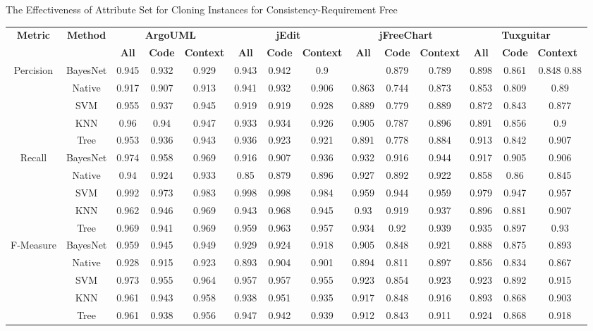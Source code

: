 \begin{table*}[htbp]
\scriptsize
{The Effectiveness of Attribute Set for Cloning Instances for Consistency-Requirement Free}
\vspace{0.5em}
\centering
\begin{tabular}{cccccccccccccc}
\toprule[1.5pt]
\multirow{2}{*}{\textbf{Metric}}&\multirow{2}{*}{\textbf{Method}}&\multicolumn{3}{c}{\textbf{ArgoUML}}&\multicolumn{3}{c}{\textbf{jEdit}}&\multicolumn{3}{c}{\textbf{jFreeChart}}&\multicolumn{3}{c}{\textbf{Tuxguitar}}\\
\cline{3-14}
&&\textbf{All}&\textbf{Code}&\textbf{Context}&\textbf{All}&\textbf{Code}&\textbf{Context}&\textbf{All}&\textbf{Code}&\textbf{Context}&\textbf{All}&\textbf{Code}&\textbf{Context}~\\
\midrule[1pt]
\multirow{5}{*}{Percision}
&BayesNet&0.945&	0.932	&0.929&		0.943&	0.942	&0.9	&	&0.879	&0.789	&0.898		&0.861	&0.848	0.88\\
&Native&0.917	&0.907&	0.913	&	0.941	&0.932&	0.906	&	0.863&	0.744&	0.873	&	0.853&	0.809	&0.89\\
&SVM&0.955&	0.937	&0.945	&	0.919	&0.919&	0.928&		0.889	&0.779&	0.889	&	0.872	&0.843	&0.877\\
&KNN&0.96	&0.94	&0.947	&	0.933&	0.934	&0.926	&	0.905&	0.787&	0.896	&	0.891&	0.856&	0.9\\
&Tree&0.953&	0.936	&0.943	&	0.936&	0.923	&0.921&		0.891&	0.778&	0.884	&	0.913	&0.842&	0.907\\

\hline
\multirow{5}{*}{Recall}
&BayesNet&0.974	&0.958	&0.969	&	0.916	&0.907&	0.936		&0.932	&0.916	&0.944	&	0.917	&0.905	&0.906\\
&Native&0.94	&0.924	&0.933&		0.85	&0.879&	0.896		&0.927&	0.892	&0.922	&	0.858	&0.86&	0.845\\
&SVM&0.992	&0.973&	0.983		&0.998	&0.998&	0.984		&0.959	&0.944	&0.959		&0.979	&0.947	&0.957\\
&KNN&0.962&	0.946&	0.969	&	0.943	&0.968&	0.945		&0.93&	0.919&	0.937	&	0.896	&0.881&	0.907\\
&Tree&0.969&	0.941	&0.969	&	0.959&	0.963	&0.957	&	0.934	&0.92&	0.939	&	0.935	&0.897	&0.93\\
\hline
\multirow{5}{*}{F-Measure}
&BayesNet&0.959&	0.945&	0.949	&	0.929	&0.924&	0.918	&	0.905&	0.848	&0.921	&	0.888&	0.875&	0.893\\
&Native&0.928&	0.915	&0.923	&0.893	&0.904	&0.901		&0.894&	0.811&	0.897	&	0.856	&0.834	&0.867\\
&SVM&0.973&	0.955&	0.964	&	0.957&	0.957&	0.955	&	0.923&	0.854	&0.923&		0.923&	0.892&	0.915\\
&KNN&0.961&	0.943&	0.958	&	0.938	&0.951&	0.935		&0.917	&0.848	&0.916&		0.893&	0.868	&0.903\\
&Tree&0.961&	0.938&	0.956	&	0.947	&0.942&	0.939	&	0.912&	0.843	&0.911&		0.924	&0.868&	0.918\\
\bottomrule[1.5pt]
\end{tabular}
\end{table*}


